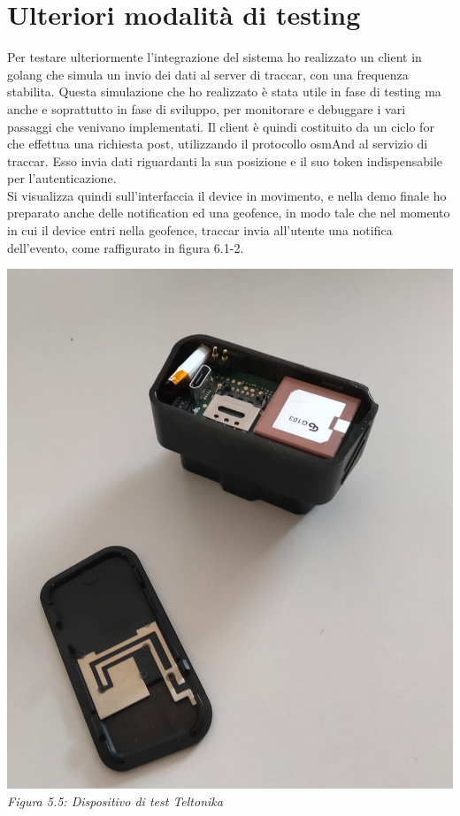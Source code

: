 \documentclass[a4paper,titlepage,12pt]{book}
\begin{document}
{\section{
Ulteriori modalità di testing}
Per testare ulteriormente l'integrazione del sistema ho realizzato un client in golang che simula un invio dei dati al server di traccar, con una frequenza stabilita. Questa simulazione che ho realizzato è stata utile in fase di testing ma anche e soprattutto in fase di sviluppo, per monitorare e debuggare i vari passaggi che venivano implementati. Il client è quindi costituito da un ciclo for che effettua una richiesta post, utilizzando il protocollo osmAnd al servizio di traccar. Esso invia dati riguardanti la sua posizione e il suo token indispensabile per l'autenticazione.\\
Si visualizza quindi sull'interfaccia il device in movimento, e nella demo finale ho preparato anche delle notification ed una geofence, in modo tale che nel momento in cui il device entri nella geofence, traccar invia all'utente una notifica dell'evento, come raffigurato in figura 6.1-2.\\
\begin{center}
\includegraphics[scale=0.2]{images/teltotest.jpeg}\\ 
\textit{Figura 5.5: Dispositivo di test Teltonika}
\end{center}

}
\end{document}
